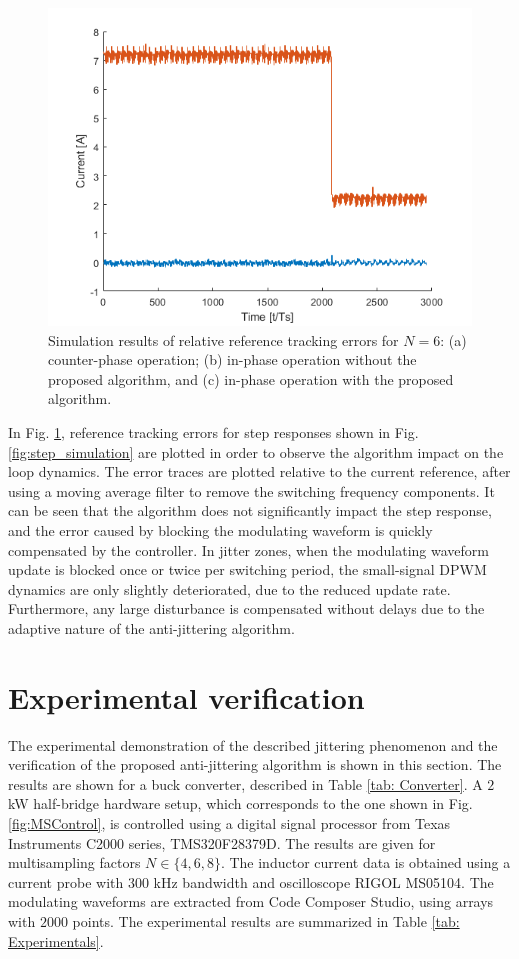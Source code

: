\documentclass[journal]{IEEEtran}
\begin{document}
\begin{figure}[t!]
    \centerline{\includegraphics[width=0.95\linewidth]{figures/nasb_step.png}}
    \caption{Simulation results of relative reference tracking errors for $N=6$: (a) counter-phase operation; (b) in-phase operation without the proposed algorithm, and (c) in-phase operation with the proposed algorithm.}
    \label{fig:errorAVG}    
\end{figure}

In Fig. \ref{fig:errorAVG}, reference tracking errors for step responses shown in Fig. \ref{fig:step_simulation} are plotted in order to observe the algorithm impact on the loop dynamics. The error traces are plotted relative to the current reference, after using a moving average filter to remove the switching frequency components. It can be seen that the algorithm does not significantly impact the step response, and the error caused by blocking the modulating waveform is quickly compensated by the controller. In jitter zones, when the modulating waveform update is blocked once or twice per switching period, the small-signal DPWM dynamics are only slightly deteriorated, due to the reduced update rate. Furthermore, any large disturbance is compensated without delays due to the adaptive nature of the anti-jittering algorithm. 

\section{Experimental verification}
The experimental demonstration of the described jittering phenomenon and the verification of the proposed anti-jittering algorithm is shown in this section. The results are shown for a buck converter, described in Table \ref{tab: Converter}. A $2$ kW half-bridge hardware setup, which corresponds to the one shown in Fig. \ref{fig:MSControl}, is controlled using a digital signal processor from Texas Instruments C2000 series, TMS320F28379D. The results are given for multisampling factors $N \in \{4,6,8 \}$. The inductor current data is obtained using a current probe with $300$ kHz bandwidth and oscilloscope RIGOL MS05104. The modulating waveforms are extracted from Code Composer Studio, using arrays with $2000$ points. 
The experimental results are summarized in Table \ref{tab: Experimentals}.
\end{document}
